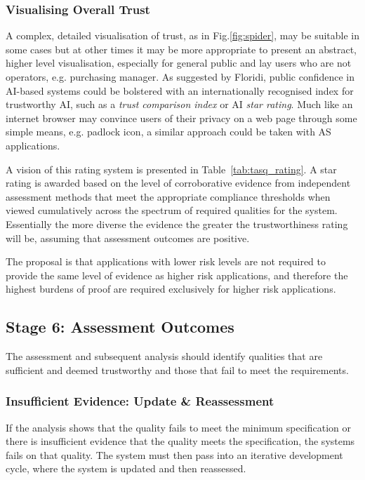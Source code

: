 \subsubsection{Visualising Overall Trust}

A complex, detailed visualisation of trust, as in Fig.\ref{fig:spider}, may be suitable in some cases but at other times it may be more appropriate to present an abstract, higher level visualisation, especially for general public and lay users who are not operators, e.g. purchasing manager. 
%
As suggested by Floridi, public confidence in AI-based systems could be bolstered with an internationally recognised index for trustworthy AI, such as a \emph{trust comparison index} or AI \emph{star rating}. Much like an internet browser may convince users of their privacy on a web page through some simple means, e.g. padlock icon, a similar approach could be taken with AS applications. 

A vision of this rating system is presented in Table~\ref{tab:tasq_rating}. 
%
A star rating is awarded based on the level of corroborative evidence from independent assessment methods that meet the appropriate compliance thresholds when viewed cumulatively across the spectrum of required qualities for the system. 
%
Essentially the more diverse the evidence the greater the trustworthiness rating will be, assuming that assessment outcomes are positive. 

The proposal is that applications with lower risk levels are not required to provide the same level of evidence as higher risk applications, and therefore the highest burdens of proof are required exclusively for higher risk applications. 



\subsection{Stage 6: Assessment Outcomes}

The assessment and subsequent analysis should identify qualities that are sufficient and deemed trustworthy and those that fail to meet the requirements. 

\subsubsection{Insufficient Evidence: Update \& Reassessment}

If the analysis shows that the quality fails to meet the minimum specification or there is insufficient evidence that the quality meets the specification, the systems fails on that quality. The system must then pass into an iterative development cycle, where the system is updated and then reassessed.

